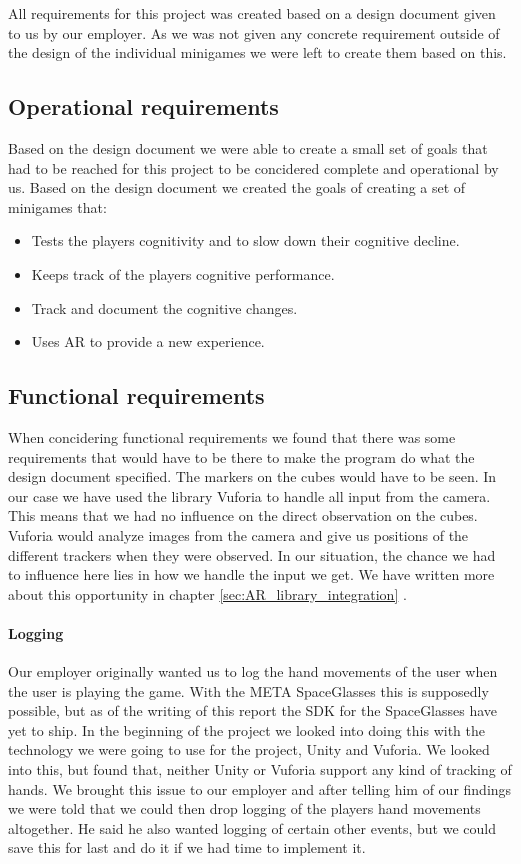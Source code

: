 All requirements for this project was created based on a design document given to us by our employer.
As we was not given any concrete requirement outside of the design of the individual minigames we
were left to create them based on this.


\subsection{Operational requirements}
Based on the design document we were able to create a small set of goals that had to be reached for this project
to be concidered complete and operational by us.
Based on the design document we created the goals of creating a set of minigames that:
\begin{itemize}
	\item Tests the players cognitivity and to slow down their cognitive decline.
	\item Keeps track of the players cognitive performance.
	\item Track and document the cognitive changes.
	\item Uses AR to provide a new experience.
\end{itemize}

\subsection{Functional requirements}
When concidering functional requirements we found that there was some requirements that would have to be there to make the program do what the design document specified. 
The markers on the cubes would have to be seen. 
In our case we have used the library \gls{Vuforia} to handle all input from the camera.
This means that we had no influence on the direct observation on the cubes. 
Vuforia would analyze images from the camera and give us positions of the different trackers when they were observed. 
In our situation, the chance we had to influence here lies in how we handle the input we get. 
We have written more about this opportunity in chapter \ref{sec:AR_library_integration} .

\paragraph{Logging}
Our employer originally wanted us to log the hand movements of the user when the user is playing the game. 
With the META SpaceGlasses this is supposedly possible, but as of the writing of this report the SDK for the SpaceGlasses have yet to ship. 
In the beginning of the project we looked into doing this with the technology we were going to use for the project, Unity and Vuforia. 
We looked into this, but found that, neither Unity or Vuforia support any kind of tracking of hands. 
We brought this issue to our employer and after telling him of our findings we were told that we could then drop logging of the players hand movements altogether. 
He said he also wanted logging of certain other events, but we could save this for last and do it if we had time to implement it.

